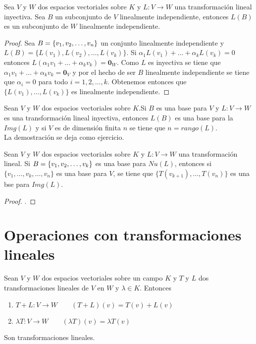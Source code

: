\begin{theorem}
Sea $V$ y $W$ dos espacios vectoriales sobre $K$ y $L : V \to W$ una transformación lineal inyectiva. Sea $B$ un subconjunto de $V$ linealmente independiente, entonces $L(B)$ es un subconjunto de $W$ linealmente independiente. 
\end{theorem}

\begin{proof}
Sea $B =  \lbrace v_1, v_2, \ldots, v_n \rbrace$ un conjunto linealmente independiente y $L(B) = \{L(v_1), L(v_2), \ldots , L(v_k)\}$. Si $\alpha_1 L(v_1) + \ldots + \alpha_k L(v_k) = 0$ entonces $L(\alpha_1 v_1 + \ldots +\alpha_k v_k) = \mathbf{0}_W$. Como $L$ es inyectiva se tiene que $\alpha_1 v_1 + \ldots + \alpha_k v_k = \mathbf{0}_V$ y por el hecho de ser $B$ linealmente independiente se tiene que $\alpha_i = 0$ para todo $i = 1, 2, \ldots , k$. Obtenemos entonces que $\{L(v_1), \ldots , L(v_k)\}$ es linealmente independiente.
\end{proof}

\begin{theorem}
Sean $V$ y $W$ dos espacios vectoriales sobre $K$.Si $B$ es una base para $V$ y $L : V \to W$ es una transformación lineal inyectiva, entonces $L(B)$ es una base para la $Img(L)$ y si $V$ es de dimensión finita $n$ se tiene que $n = rango(L)$.\\

La demostración se deja como ejercicio. %
\end{theorem}

\begin{theorem}
Sean $V$ y $W$ dos espacios vectoriales sobre $K$ y $L : V \to W$ una transformación lineal. Si $B =  \lbrace v_1, v_2, \ldots, v_k \rbrace$ es una base para $Nu(L)$, entonces si $\{v_1 , \ldots , v_{k}, \ldots , v_n\}$ es una base para $V$, se tiene que $\{T(v_{k+1}), \ldots , T(v_n)\}$ es una bse para $Img(L)$.
\end{theorem}

\begin{proof}
.
\end{proof}

\section{Operaciones con transformaciones lineales}
\begin{dfn}
Sean $V$ y $W$ dos espacios vectoriales sobre un campo $K$ y $T$ y $L$ dos transformaciones lineales de $V$ en $W$ y $\lambda \in K$. Entonces 
\begin{enumerate}
\item $T + L : V \to W \qquad (T + L)(v) = T(v) + L(v)$
\item $\lambda T : V \to W \qquad (\lambda T)(v) = \lambda T(v)$
\end{enumerate}
Son transformaciones lineales.
\end{dfn}

